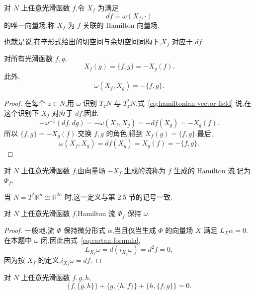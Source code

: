 \begin{definition}\label{def:hamiltonian-vector-field}
对 $N$ 上任意光滑函数 $f$,令 $X_f$ 为满足
\[
 df=\omega(X_f,\cdot)\label{eq:hamiltonian-vector-field}
\]
的唯一向量场.称 $X_f$ 为 $f$ 关联的 Hamilton 向量场.
\end{definition}

也就是说,在辛形式给出的切空间与余切空间同构下,$X_f$ 对应于 $df$.

\begin{proposition}\label{prop:hamiltonian-vector-field-poisson}
对所有光滑函数 $f,g$,
\[
 X_f(g)=\{f,g\}=-X_g(f).
\]
此外,
\[
 \omega(X_f,X_g)=-\{f,g\}.
\]
\end{proposition}

\begin{proof}
在每个 $z\in N$,用 $\omega$ 识别 $T_zN$ 与 $T_z^*N$.式~\eqref{eq:hamiltonian-vector-field} 说,在这个识别下 $X_f$ 对应于 $df$.因此
\[
 -\omega^{-1}(df,dg)
 =-\omega(X_f,X_g)
 =-df(X_g)=-X_g(f).
\]
所以 $\{f,g\}=-X_g(f)$.交换 $f,g$ 的角色,得到 $X_f(g)=\{f,g\}$.最后,
\[
 \omega(X_f,X_g)=df(X_g)=X_g(f)=-\{f,g\}.
\]
\end{proof}

\begin{definition}[Hamilton 流]\label{def:hamiltonian-flow}
对 $N$ 上任意光滑函数 $f$,由向量场 $-X_f$ 生成的流称为 $f$ 生成的 Hamilton 流,记为 $\Phi_f$.
\end{definition}

当 $N=T^*\mathbb R^n\cong\mathbb R^{2n}$ 时,这一定义与第 2.5 节的记号一致.

\begin{proposition}\label{prop:hamiltonian-flow-symplectic}
对 $N$ 上任意光滑函数 $f$,Hamilton 流 $\Phi_f$ 保持 $\omega$.
\end{proposition}

\begin{proof}
一般地,流 $\Phi$ 保持微分形式 $\alpha$,当且仅当生成 $\Phi$ 的向量场 $X$ 满足 $L_X\alpha=0$.在本题中 $\omega$ 闭,因此由式~\eqref{eq:cartan-formula},
\[
 L_{X_f}\omega=d(i_{X_f}\omega)=d^2f=0,
\]
因为按 $X_f$ 的定义,$i_{X_f}\omega=df$.
\end{proof}

\begin{proposition}\label{prop:poisson-jacobi}
对 $N$ 上任意光滑函数 $f,g,h$,
\[
 \{f,\{g,h\}\}+\{g,\{h,f\}\}+\{h,\{f,g\}\}=0.
\]
\end{proposition}

